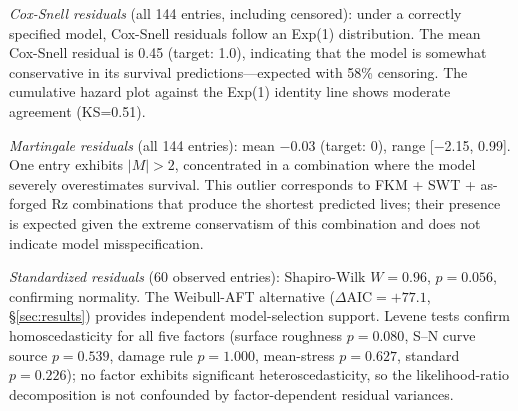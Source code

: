 \documentclass[twocolumn,12pt,a4paper]{article}
\begin{document}
\begin{enumerate}
        \textit{Cox-Snell residuals} (all 144 entries, including censored):
        under a correctly specified model, Cox-Snell residuals follow
        an Exp(1) distribution. The mean Cox-Snell residual is 0.45
        (target: 1.0), indicating that the model is somewhat
        conservative in its survival predictions---expected with
        58\% censoring. The cumulative hazard plot against the
        Exp(1) identity line shows moderate agreement (KS=0.51).

        \textit{Martingale residuals} (all 144 entries): mean $-$0.03
        (target: 0), range [$-$2.15, 0.99]. One entry exhibits
        $|M| > 2$, concentrated in a combination where the model
        severely overestimates survival. This outlier corresponds to
        FKM + SWT + as-forged Rz combinations that produce the
        shortest predicted lives; their presence is expected given the
        extreme conservatism of this combination and does not indicate
        model misspecification.

        \textit{Standardized residuals} (60 observed entries):
        Shapiro-Wilk $W=0.96$, $p=0.056$, confirming normality.
        The Weibull-AFT alternative ($\Delta\mathrm{AIC}=+77.1$,
        \S\ref{sec:results}) provides independent model-selection
        support. Levene tests confirm homoscedasticity for all five
        factors (surface roughness $p=0.080$, S--N curve source
        $p=0.539$, damage rule $p=1.000$, mean-stress $p=0.627$,
        standard $p=0.226$); no factor exhibits significant
        heteroscedasticity, so the likelihood-ratio decomposition is
        not confounded by factor-dependent residual variances.


\end{enumerate}
\end{document}
